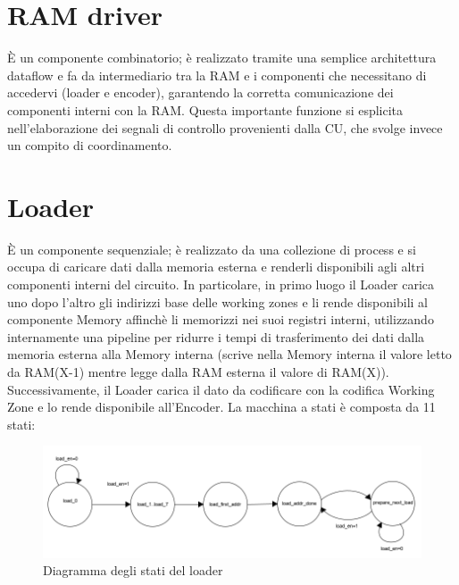 \documentclass[10pt,english, openany]{book}
\begin{document}
\section{RAM driver}

È un componente combinatorio; è realizzato tramite una semplice architettura dataflow e fa da intermediario tra la RAM e i componenti che necessitano di accedervi (loader e encoder), garantendo la corretta comunicazione dei componenti interni con la RAM. Questa importante funzione si esplicita nell’elaborazione dei segnali di controllo provenienti dalla CU, che svolge invece un compito di coordinamento.

\section{Loader}

È un componente sequenziale; è realizzato da una collezione di process e si occupa di caricare dati dalla memoria esterna e renderli disponibili agli altri componenti interni del circuito. In particolare, in primo luogo il Loader carica uno dopo l’altro gli indirizzi base delle working zones e li rende disponibili al componente Memory affinchè li memorizzi nei suoi registri interni, utilizzando internamente una pipeline per ridurre i tempi di trasferimento dei dati dalla memoria esterna alla Memory interna (scrive nella Memory interna il valore letto da RAM(X-1) mentre legge dalla RAM esterna il valore di RAM(X)). Successivamente, il Loader carica il dato da codificare con la codifica Working Zone e lo rende disponibile all’Encoder. La macchina a stati è composta da 11 stati:
\begin{figure}[h!]
    \centering
    \includegraphics[scale=0.9]{stati_loader.png}
    \caption{Diagramma degli stati del loader}
    \label{fig:stati_loader}
\end{figure}{}
\end{document}
